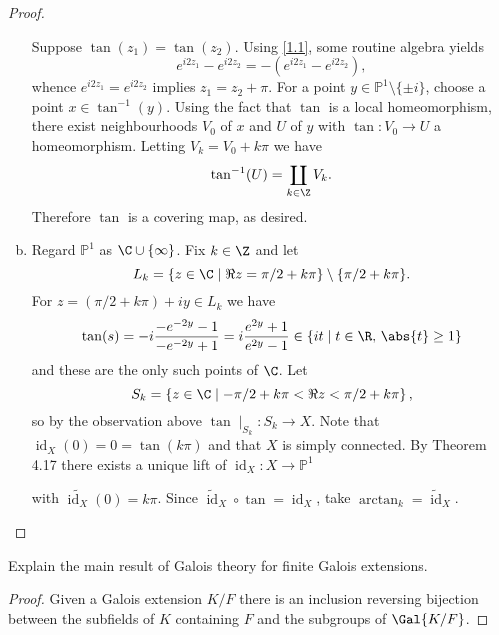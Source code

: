 \documentclass[10pt]{amsart}
\begin{document}
\begin{thm}
\begin{proof}
\begin{enumerate}[(a)]
      Suppose $\tan(z_1) = \tan(z_2)$.
      Using \eqref{1.1}, some routine algebra yields 
      $$e^{i2z_1} - e^{i2z_2} = -(e^{i2z_1} - e^{i2z_2}),$$
      whence $e^{i2z_1} = e^{i2z_2}$ implies $z_1 = z_2 + \pi$.
      For a point $y \in \mathbb{P}^1 \setminus \{\pm i\}$, choose a point $x \in \tan^{-1}(y)$.
      Using the fact that $\tan$ is a local homeomorphism, there exist neighbourhoods $V_0$ of $x$ and $U$ of $y$ with $\tan \colon V_0 \rightarrow U$ a homeomorphism.
      Letting $V_k = V_0 + k\pi$ we have
      $$\tan^{-1}(U) = \coprod_{k \in \Z} V_k.$$
      Therefore $\tan$ is a covering map, as desired.
    \item
      Regard $\mathbb{P}^1$ as $\C \cup \{\infty\}$.
      Fix $k \in \Z$ and let 
      $$L_k = \left\{z \in \C \;\middle\vert\; \Re{z} = \pi/2 + k\pi\right\} \setminus \{\pi/2 + k\pi\}.$$
      For $z = (\pi/2 + k\pi) + iy \in L_k$ we have
      $$\tan(s) = -i\frac{-e^{-2y} - 1}{-e^{-2y} + 1} = i \frac{e^{2y} + 1}{e^{2y} - 1} \in \left\{it \;\middle\vert\; t \in \R,\, \abs{t} \geq 1\right\}$$
      and these are the only such points of $\C$.
      Let
      $$S_k = \left\{z \in \C \;\middle\vert\; -\pi/2 + k\pi < \Re{z} < \pi/2 + k\pi\right\},$$
      so by the observation above $\tan \mid_{S_k} \colon S_k \rightarrow X$.
      Note that $\operatorname{id}_X(0) = 0 = \tan(k\pi)$ and that $X$ is simply connected.
      By Theorem 4.17 there exists a unique lift of $\operatorname{id}_X \colon X \rightarrow \mathbb{P}^1$
      \begin{center}
      \end{center}
      with $\tilde{\operatorname{id}_X}(0) = k\pi$.
      Since $\tilde{\operatorname{id}}_X \circ \tan = \operatorname{id}_X$, take $\arctan_k = \tilde{\operatorname{id}}_X$.
    \end{enumerate}
  \end{proof}
\end{thm}

\begin{thm}
  Explain the main result of Galois theory for finite Galois extensions.
  
  \begin{proof}
    Given a Galois extension $K/F$ there is an inclusion reversing bijection between the subfields of $K$ containing $F$ and the subgroups of $\Gal{K/F}$.
  \end{proof}
\end{thm}
\end{document}
